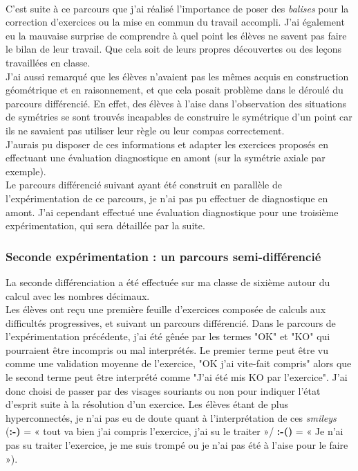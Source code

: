 \paragraph{}C'est suite à ce parcours que j'ai réalisé l'importance de poser des \textit{balises} pour la correction d'exercices ou la mise en commun du travail accompli. J'ai également eu la mauvaise surprise de comprendre à quel point les élèves ne savent pas faire le bilan de leur travail. Que cela soit de leurs propres découvertes ou des leçons travaillées en classe.\\
J'ai aussi remarqué que les élèves n'avaient pas les mêmes acquis en construction géométrique et en raisonnement, et que cela posait problème dans le déroulé du parcours différencié. En effet, des élèves à l'aise dans l'observation des situations de symétries se sont trouvés incapables de construire le symétrique d'un point car ils ne savaient pas utiliser leur règle ou leur compas correctement.\\
J'aurais pu disposer de ces informations et adapter les exercices proposés en effectuant une évaluation diagnostique en amont (sur la symétrie axiale par exemple).\\
Le parcours différencié suivant ayant été construit en parallèle de l'expérimentation de ce parcours, je n'ai pas pu effectuer de diagnostique en amont. J'ai cependant effectué une évaluation diagnostique pour une troisième expérimentation, qui sera détaillée par la suite.\\


\subsubsection{Seconde expérimentation : un parcours semi-différencié}
La seconde différenciation a été effectuée sur ma classe de sixième autour du calcul avec les nombres décimaux.\\
Les élèves ont reçu une première feuille d'exercices composée de calculs aux difficultés progressives, et suivant un parcours différencié. Dans le parcours de l'expérimentation précédente, j'ai été gênée par les termes "OK" et "KO" qui pourraient être incompris ou mal interprétés. Le premier terme peut être vu comme une validation moyenne de l'exercice, "OK j'ai vite-fait compris" alors que le second terme peut être interprété comme "J'ai été mis KO par l'exercice". J'ai donc choisi de passer par des visages souriants ou non pour indiquer l'état d'esprit suite à la résolution d'un exercice. Les élèves étant de plus hyperconnectés, je n'ai pas eu de doute quant à l'interprétation de ces \textit{smileys} (\textbf{:-)} = « tout va bien j'ai compris l'exercice, j'ai su le traiter »/  \textbf{:-()} = « Je n'ai pas su traiter l'exercice, je me suis trompé ou je n'ai pas été à l'aise pour le faire »).
